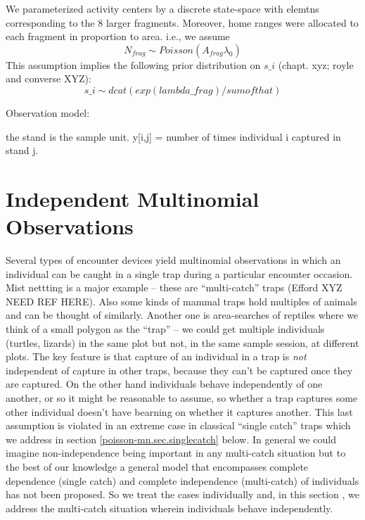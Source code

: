 {We parameterized activity centers by a discrete state-space with elemtns
corresponding to the 8 larger fragments. Moreover, home ranges were allocated
to each fragment in 
proportion to area. i.e., we assume
\[
 N_{frag} \sim Poisson(A_{frag} \lambda_{0} )
\]
This assumption implies the following prior distribution on $s\_{i}$ (chapt.
xyz; royle and converse XYZ):
\[
s\_{i} \sim  dcat(  exp( lambda\_frag ) / sum of that )
\]

Observation model:  

the stand is the sample unit.
y[i,j] = number of times individual i captured in stand j.










\section{Independent Multinomial Observations}

Several types of encounter devices yield multinomial observations in
which an individual can be caught in a single trap during a particular
encounter occasion.  Mist nettting is a major example -- these are
``multi-catch'' traps (Efford XYZ NEED REF HERE). Also some kinds of
mammal traps hold multiples of animals and can be thought of
similarly. Another one is area-searches of reptiles where we think of
a small polygon as the ``trap'' -- we could get multiple individuals
(turtles, lizards) in the same plot but not, in the same sample
session, at different plots.  The key feature is that capture of an
individual in a trap is {\it not} independent of capture in other
traps, because they can't be captured once they are captured. On the
other hand individuals behave independently of one another, or so it
might be reasonable to assume, so whether a trap captures some other
individual doesn't have bearning on whether it captures another.  This
last assumption is violated in an extreme case in classical ``single
catch'' traps which we address in section \ref{poisson-mn.sec.singlecatch}
below. In general we could imagine non-independence being important in
any multi-catch situation but to the best of our knowledge a general
model that encompasses complete dependence (single catch) and complete
independence (multi-catch) of individuals has not been proposed.  So
we treat the cases individually and, in this section , we address the
multi-catch situation wherein individuals behave independently.


}
